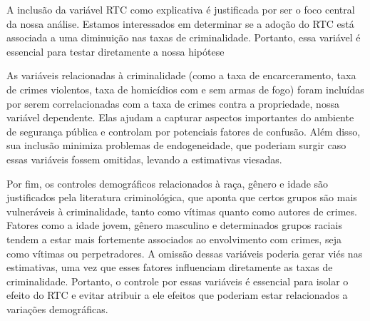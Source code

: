 \documentclass[12pt]{article}
\begin{document}
A inclusão da variável RTC como explicativa é justificada por ser o foco
central da nossa análise. Estamos interessados em determinar se a adoção
do RTC está associada a uma diminuição nas taxas de criminalidade.
Portanto, essa variável é essencial para testar diretamente a nossa
hipótese

As variáveis relacionadas à criminalidade (como a taxa de
encarceramento, taxa de crimes violentos, taxa de homicídios com e sem
armas de fogo) foram incluídas por serem correlacionadas com a taxa de
crimes contra a propriedade, nossa variável dependente. Elas ajudam a
capturar aspectos importantes do ambiente de segurança pública e
controlam por potenciais fatores de confusão. Além disso, sua inclusão
minimiza problemas de endogeneidade, que poderiam surgir caso essas
variáveis fossem omitidas, levando a estimativas viesadas.

Por fim, os controles demográficos relacionados à raça, gênero e idade
são justificados pela literatura criminológica, que aponta que certos
grupos são mais vulneráveis à criminalidade, tanto como vítimas quanto
como autores de crimes. Fatores como a idade jovem, gênero masculino e
determinados grupos raciais tendem a estar mais fortemente associados ao
envolvimento com crimes, seja como vítimas ou perpetradores. A omissão
dessas variáveis poderia gerar viés nas estimativas, uma vez que esses
fatores influenciam diretamente as taxas de criminalidade. Portanto, o
controle por essas variáveis é essencial para isolar o efeito do RTC e
evitar atribuir a ele efeitos que poderiam estar relacionados a
variações demográficas.
\end{document}
